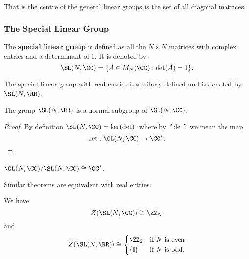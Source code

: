 \documentclass[12pt, a4paper]{article}
\begin{document}
\begin{mdremark}
    That is the centre of the general linear groups is the set of all diagonal matrices.
\end{mdremark}

\subsubsection{The Special Linear Group}

\begin{definition}
    The \textbf{special linear group} is defined as all the \(N \times N\) matrices with complex entries and a determinant of \(1\). It is denoted by 
    \[\SL(N,\CC) = \{A \in M_N(\CC) : \det(A) =1\}.\]
\end{definition}

\begin{mdremark}
    The special linear group with real entries is similarly defined and is denoted by \(\SL(N,\RR)\).
\end{mdremark}

\begin{theorem}
    The group \(\SL(N,\RR)\) is a normal subgroup of \(\GL(N,\CC)\).
\end{theorem}

\begin{proof}
    By definition \(\SL(N,\CC)=\ker(\det)\), where by \("\det"\) we mean the map
    \[\det: \GL(N,\CC) \to \CC^*.\]
\end{proof}

\begin{theorem}
    \(\GL(N,\CC) / \SL(N,\CC) \cong \CC^*\).
\end{theorem}

\begin{mdremark}
    Similar theorems are equivalent with real entries.
\end{mdremark}

\begin{mdthm}
    We have
    \[Z(\SL(N,\CC)) \cong \ZZ_N\]
    and
    \[\begin{aligned}
        Z(\SL(N,\RR)) \cong \begin{cases}
            \ZZ_2 &\text{if } N \text{ is even} \\
            \{\mathbb{I}\} &\text{if } N \text{ is odd}.
        \end{cases}
    \end{aligned}\]
\end{mdthm}
\end{document}
